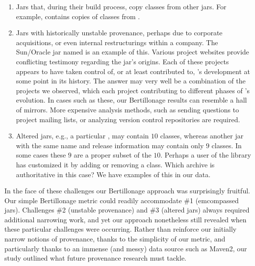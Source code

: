 \begin{enumerate}

    \item Jars that, during their build process, copy classes from other jars.
    For example,  contains copies of classes from
    .

    \item Jars with historically unstable provenance, perhaps due to corporate
    acquisitions, or even internal restructurings within a company.  The
    Sun/Oracle jar named  is an example of this.  Various
    project websites provide conflicting testimony regarding the jar's
    origins.
    Each of these projects appears to have taken control of, or at least
    contributed to, 's development at some point in its
    history.  The answer may very well be a combination of the projects we
    observed, which each project contributing to different phases of
    's evolution.  In cases such as these, our
    Bertillonage results can resemble a hall of mirrors.  More expensive
    analysis methods, such as sending questions to project mailing lists,
    or analyzing version control repositories are required.

    \item Altered jars, e.g., a particular , may contain
    $10$ classes, whereas another jar with the same name and release
    information may contain only $9$ classes.  In some cases these $9$ are
    a proper subset of the $10$.  Perhaps a user of the library has
    customized it by adding or removing a class.  Which archive is
    authoritative in this case?  We have examples of this in our data.

\end{enumerate}

In the face of these challenges our Bertillonage approach was surprisingly
fruitful.  Our simple Bertillonage metric could readily accommodate \#1
(emcompassed jars).  Challenges \#2 (unstable provenance) and \#3 (altered
jars) always required additional narrowing work, and yet our approach
nonetheless still revealed when these particular challenges were occurring.
Rather than reinforce our initially narrow notions of provenance, thanks to
the simplicity of our metric, and particularly thanks to an immense (and
messy) data source such as Maven2, our study outlined what future
provenance research must tackle.

